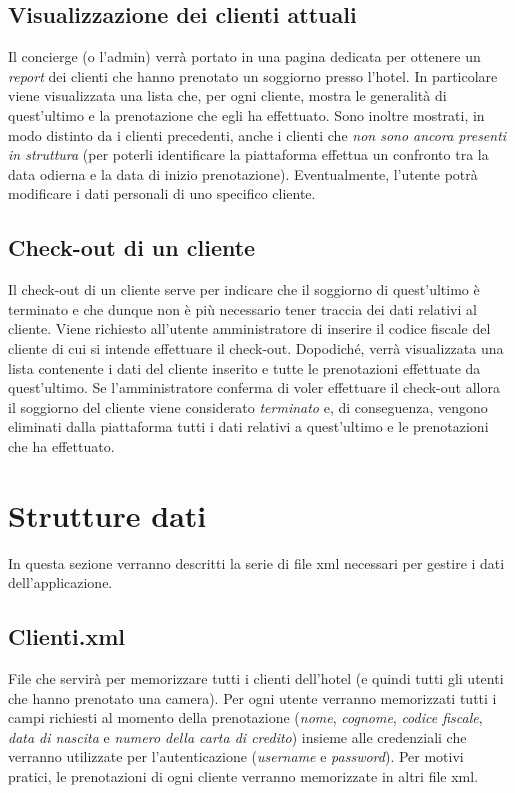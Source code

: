 \documentclass [a4paper, 12pt]{book}
\begin{document}
\subsection{Visualizzazione dei clienti attuali}
Il concierge (o l'admin) verrà portato in una pagina dedicata per ottenere un \textit{report} dei clienti che hanno prenotato un soggiorno presso l'hotel. In particolare viene visualizzata una lista che, per ogni cliente, mostra le generalità di quest'ultimo e la prenotazione che egli ha effettuato. Sono inoltre mostrati, in modo distinto da i clienti precedenti, anche i clienti che \textit{non sono ancora presenti in struttura} (per poterli identificare la piattaforma effettua un confronto tra la data odierna e la data di inizio prenotazione). Eventualmente, l'utente potrà modificare i dati personali di uno specifico cliente.



\subsection{Check-out di un cliente}
Il check-out di un cliente serve per indicare che il soggiorno di quest'ultimo è terminato e che dunque non è più necessario tener traccia dei dati relativi al cliente. Viene richiesto all'utente amministratore di inserire il codice fiscale del cliente di cui si intende effettuare il check-out. Dopodiché, verrà visualizzata una lista contenente i dati del cliente inserito e tutte le prenotazioni effettuate da quest'ultimo. Se l'amministratore conferma di voler effettuare il check-out allora il soggiorno del cliente viene considerato \textit{terminato} e, di conseguenza, vengono eliminati dalla piattaforma tutti i dati relativi a quest'ultimo e le prenotazioni che ha effettuato.


\medskip
\medskip

\section{Strutture dati}
In questa sezione verranno descritti la serie di file xml necessari per gestire i dati dell'applicazione.

\subsection{Clienti.xml}
File che servirà per memorizzare tutti i clienti dell'hotel (e quindi tutti gli utenti che hanno prenotato una camera). Per ogni utente verranno memorizzati tutti i campi richiesti al momento della prenotazione (\textit{nome}, \textit{cognome}, \textit{codice fiscale}, \textit{data di nascita} e \textit{numero della carta di credito}) insieme alle credenziali che verranno utilizzate per l'autenticazione (\textit{username} e \textit{password}). Per motivi pratici, le prenotazioni di ogni cliente verranno memorizzate in altri file xml.
\end{document}
